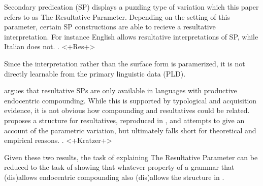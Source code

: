 \documentclass[letterpaper]{article}
\begin{document}
Secondary predication (SP) displays a puzzling type of variation which this paper refers to as The Resultative Parameter.
Depending on the setting of this parameter, certain SP constructions are able to recieve a resultative interpretation.
For instance English allows resultative interpretations of SP, while Italian does not.
\ex. <+Res+>

Since the interpretation rather than the surface form is paramerized, it is not directly learnable from the primary linguistic data (PLD).

\textcite{snyder2001nature} argues that resultative SPs are only available in languages with productive endocentric compounding.
While this is supported by typological and acquisition evidence, it is not obvious how compounding and resultatives could be related.
\textcite{kratzer_building_2004} proposes a structure for resultatives, reproduced in \Next, and attempts to give an account of the parametric variation, but ultimately falls short for theoretical and empirical reasons.
\ex. <+Kratzer+>

Given these two results, the task of explaining The Resultative Parameter can be reduced to the task of showing that whatever property of a grammar that (dis)allows endocentric compounding also (dis)allows the structure in \Last.
\end{document}

